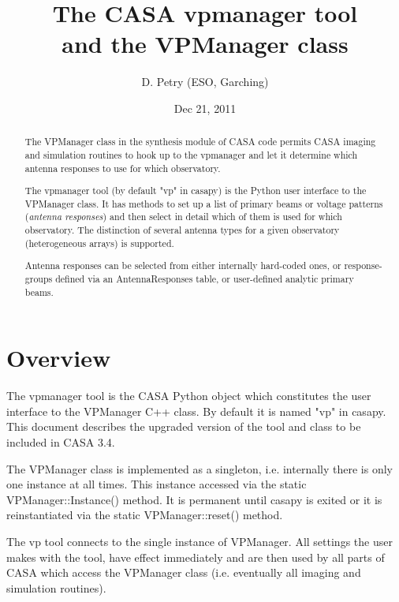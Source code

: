 \documentclass[12pt]{article}
\begin{document}
\title{The CASA vpmanager tool\\ and the VPManager class}
\author{D. Petry (ESO, Garching)}
\date{Dec 21, 2011\\%
}
\maketitle
\normalsize
{}

\begin{abstract}
The VPManager class in the synthesis module of CASA code permits 
CASA imaging and simulation routines to hook up to the vpmanager and let it determine
which antenna responses to use for which observatory.

The vpmanager tool (by default "vp" in casapy) is the Python user interface to the VPManager
class. It has methods to set up a list of primary beams or voltage patterns
({\it antenna responses}) and then select in detail 
which of them is used for which observatory.
The distinction of several antenna types for a given observatory (heterogeneous
arrays) is supported.
 
Antenna responses can be selected from either internally 
hard-coded ones, or response-groups defined via an AntennaResponses table, or
user-defined analytic primary beams.
\end{abstract}

\section{Overview}

The vpmanager tool is the CASA Python object which constitutes the
user interface to the VPManager C++ class. By default it is named "vp" in casapy.
This document describes
the upgraded version of the tool and class to be included in CASA 3.4.

The VPManager class is implemented as a singleton, i.e. internally there is only one instance
at all times. This instance accessed via the static VPManager::Instance() method. It is permanent 
until casapy is exited or it is reinstantiated via the static VPManager::reset() method.

The vp tool connects to the single instance of VPManager.
All settings the user makes with the tool, have effect immediately and are then used
by all parts of CASA which access the VPManager class (i.e. eventually all imaging and simulation
routines).
\end{document}
